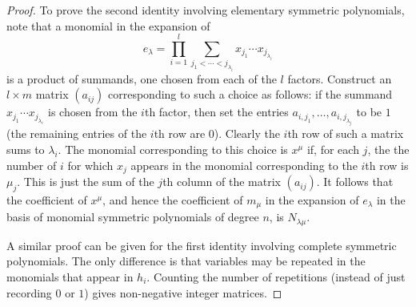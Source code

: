 \documentclass[11pt]{amsproc}
\theoremstyle{definition}
\theoremstyle{example}
\begin{document}
\begin{proof}
  To prove the second identity involving elementary symmetric polynomials, note that a monomial in the expansion of
  \begin{displaymath}
    e_\lambda = \prod_{i=1}^l \sum_{j_1<\dotsb<j_{\lambda_i}}x_{j_1}\dotsb x_{j_{\lambda_i}}
  \end{displaymath}
  is a product of summands, one chosen from each of the $l$ factors.
  Construct an $l\times m$ matrix $(a_{ij})$ corresponding to such a choice as follows:
  if the summand $x_{j_1}\dotsb x_{j_{\lambda_i}}$ is chosen from the $i$th factor, then set the entries $a_{i,j_1},\dotsc, a_{i, j_{\lambda_j}}$ to be $1$ (the remaining entries of the $i$th row are $0$).
  Clearly the $i$th row of such a matrix sums to $\lambda_i$.
  The monomial corresponding to this choice is $x^\mu$ if, for each $j$, the the number of $i$ for which $x_j$ appears in the monomial corresponding to the $i$th row is $\mu_j$. This is just the sum of the $j$th column of the matrix $(a_{ij})$.
  It follows that the coefficient of $x^\mu$, and hence the coefficient of $m_\mu$ in the expansion of $e_\lambda$ in the basis of monomial symmetric polynomials of degree $n$, is $N_{\lambda\mu}$.

A similar proof can be given for the first identity involving complete symmetric polynomials. The only difference is that variables may be repeated in the monomials that appear in $h_i$. Counting the number of repetitions (instead of just recording $0$ or $1$) gives non-negative integer matrices.
\end{proof}
\end{document}
